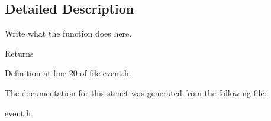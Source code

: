 \subsection{Detailed Description}
Write what the function does here. 

\begin{DoxyReturn}{Returns}

\end{DoxyReturn}


Definition at line 20 of file event.\+h.



The documentation for this struct was generated from the following file\+:\begin{DoxyCompactItemize}
\item 
event.\+h\end{DoxyCompactItemize}
